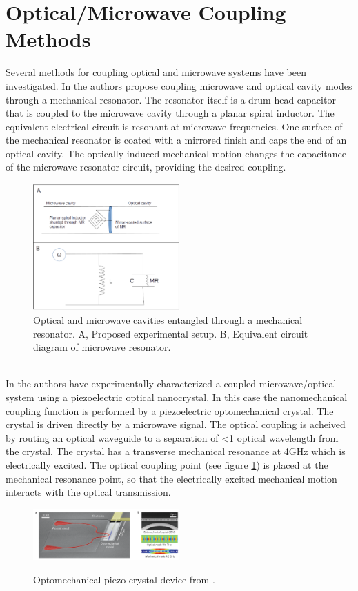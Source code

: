 \documentclass[a4paper,11pt, twocolumn]{article}
\numberwithin{equation}{section}
\begin{document}
\section{Optical/Microwave Coupling Methods}
Several methods for coupling optical and microwave systems have been investigated. 
In \cite{nanoMR} the authors propose coupling microwave and optical cavity modes through a mechanical resonator.
The resonator itself is a drum-head capacitor that is coupled to the microwave cavity through a planar spiral inductor. 
The equivalent electrical circuit is resonant at microwave frequencies.
One surface of the mechanical resonator is coated with a mirrored finish and caps the end of an optical cavity.
The optically-induced mechanical motion changes the capacitance of the microwave resonator circuit, providing the desired coupling.
\begin{figure}[ht]
 \caption{Optical and microwave cavities entangled through a mechanical resonator. A, Proposed experimental setup. B, Equivalent circuit diagram of microwave resonator.}
 \centering
   \includegraphics[width=0.5\textwidth]{figs/f1}
\end{figure}
\\In \cite{nanoCrystal} the authors have experimentally characterized a coupled microwave/optical system using a piezoelectric optical nanocrystal.
In this case the nanomechanical coupling function is performed by a piezoelectric optomechanical crystal.
The crystal is driven directly by a microwave signal. 
The optical coupling is acheived by routing an optical waveguide to a separation of <1 optical wavelength from the crystal.
The crystal has a transverse mechanical resonance at 4GHz which is electrically excited.
The optical coupling point (see figure \ref{fig:optoCrystal}) is placed at the mechanical resonance point, so that the electrically excited mechanical motion interacts with the optical transmission.
\begin{figure}[ht]
 \caption{Optomechanical piezo crystal device from \cite{nanoCrystal}.}
 \centering
   \includegraphics[width=0.5\textwidth]{figs/OptoMechCrystal}
 \label{fig:optoCrystal}
\end{figure}
\end{document}
